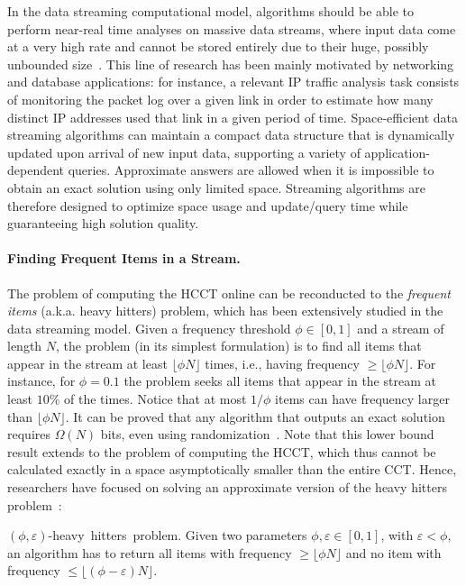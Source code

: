In the data streaming computational model, algorithms should be able to perform near-real time analyses on massive data streams, where input data come at a very high rate and cannot be stored entirely due to their huge, possibly unbounded size~\cite{Demetrescu07,Muthukrishnan05}. This line of research has been mainly motivated by networking and database applications: for instance, a relevant IP traffic analysis task consists of monitoring the packet log over a given link in order to estimate how many distinct IP addresses used that link in a given period of time. Space-efficient data streaming algorithms can maintain a compact data structure that is dynamically updated upon arrival of new input data, supporting a variety of application-dependent queries. Approximate answers are allowed when it is impossible to obtain an exact solution using only limited space. Streaming algorithms are therefore designed to optimize space usage and update/query time while guaranteeing high solution quality.


\paragraph*{Finding Frequent Items in a Stream.} The problem of computing the HCCT online can be reconducted to the {\em frequent items} (a.k.a. heavy hitters) problem, which has been extensively studied in the data streaming model. Given a frequency threshold $\phi\in[0,1]$ and a stream of length $N$, the problem (in its simplest formulation) is to find all items that appear in the stream at least $\lfloor\phi N\rfloor$ times, i.e., having frequency $\ge\lfloor\phi N\rfloor$. For instance, for $\phi=0.1$ the problem seeks all items that appear in the stream at least $10\%$ of the times. Notice that at most $1/\phi$ items can have frequency larger than $\lfloor\phi N\rfloor$.  It can be proved that any algorithm that outputs an exact solution requires $\Omega(N)$ bits, even using randomization~\cite{Muthukrishnan05}. Note that this lower bound result extends to the problem of computing the HCCT, which thus cannot be calculated exactly in a space asymptotically smaller than the entire CCT. Hence, researchers have focused on solving an approximate version of the heavy hitters problem~\cite{Muthukrishnan05}:

\begin{definition} 
{\mbox{$(\phi,\varepsilon)$-heavy hitters problem.}} Given two parameters $\phi,\varepsilon\in[0,1]$, with $\varepsilon<\phi$, an algorithm has to return all items with frequency $\ge\lfloor\phi N\rfloor$ and no item with frequency $\le\lfloor(\phi-\varepsilon) N\rfloor$.
\end{definition} 

